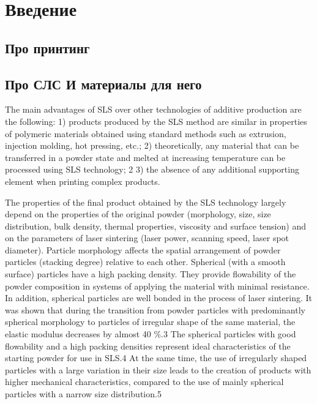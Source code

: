 \documentclass[oneside,final,14pt]{extreport}
\begin{document}
	
	
	
	
	
	\tableofcontents
	
	\chapter*{Введение}
	
	\section{Про принтинг}
	




\section{Про СЛС И материалы для него}
The main advantages of SLS over other technologies of additive production are the following: 1) products produced by the SLS method are similar in properties of polymeric materials obtained using standard methods such as extrusion, injection molding, hot pressing, etc.; 2) theoretically, any material that can be transferred in a powder state and melted at increasing temperature can be processed using SLS technology; 2 3) the absence of any additional supporting element when printing complex products.

The properties of the final product obtained by the SLS technology largely depend on the properties of the original powder (morphology, size, size distribution, bulk density, thermal properties, viscosity and surface tension) and on the parameters of laser sintering (laser power, scanning speed, laser spot diameter). Particle morphology affects the spatial arrangement of powder particles (stacking degree) relative to each other. Spherical (with a smooth surface) particles have a high packing density. They provide flowability of the powder composition in systems of applying the material with minimal resistance. In addition, spherical particles are well bonded in the process of laser sintering. It was shown that during the transition from powder particles with predominantly spherical morphology to particles of irregular shape of the same material, the elastic modulus decreases by almost 40 \%.3 The spherical particles with good flowability and a high packing densities represent ideal characteristics of the starting powder for use in SLS.4 At the same time, the use of irregularly shaped particles with a large variation in their size leads to the creation of products with higher mechanical characteristics, compared to the use of mainly spherical particles with a narrow size distribution.5
	
\end{document}

